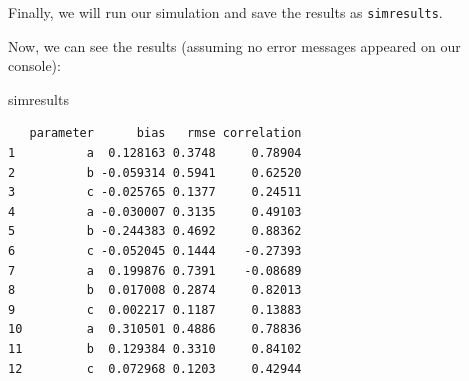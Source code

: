 \documentclass[
]{book}
\newenvironment{Shaded}{\begin{snugshade}}{\end{snugshade}}
\newcommand{\CommentTok}[1]{\textcolor[rgb]{0.56,0.35,0.01}{\textit{#1}}}
\newcommand{\DataTypeTok}[1]{\textcolor[rgb]{0.13,0.29,0.53}{#1}}
\newcommand{\DecValTok}[1]{\textcolor[rgb]{0.00,0.00,0.81}{#1}}
\newcommand{\KeywordTok}[1]{\textcolor[rgb]{0.13,0.29,0.53}{\textbf{#1}}}
\newcommand{\NormalTok}[1]{#1}
\newcommand{\OperatorTok}[1]{\textcolor[rgb]{0.81,0.36,0.00}{\textbf{#1}}}
\newcommand{\StringTok}[1]{\textcolor[rgb]{0.31,0.60,0.02}{#1}}
\begin{document}
Finally, we will run our simulation and save the results as \texttt{simresults}.

\begin{Shaded}
\end{Shaded}

Now, we can see the results (assuming no error messages appeared on our console):

\begin{Shaded}
\begin{Highlighting}[]
\NormalTok{simresults}
\end{Highlighting}
\end{Shaded}

\begin{verbatim}
   parameter      bias   rmse correlation
1          a  0.128163 0.3748     0.78904
2          b -0.059314 0.5941     0.62520
3          c -0.025765 0.1377     0.24511
4          a -0.030007 0.3135     0.49103
5          b -0.244383 0.4692     0.88362
6          c -0.052045 0.1444    -0.27393
7          a  0.199876 0.7391    -0.08689
8          b  0.017008 0.2874     0.82013
9          c  0.002217 0.1187     0.13883
10         a  0.310501 0.4886     0.78836
11         b  0.129384 0.3310     0.84102
12         c  0.072968 0.1203     0.42944
\end{verbatim}
\end{document}
